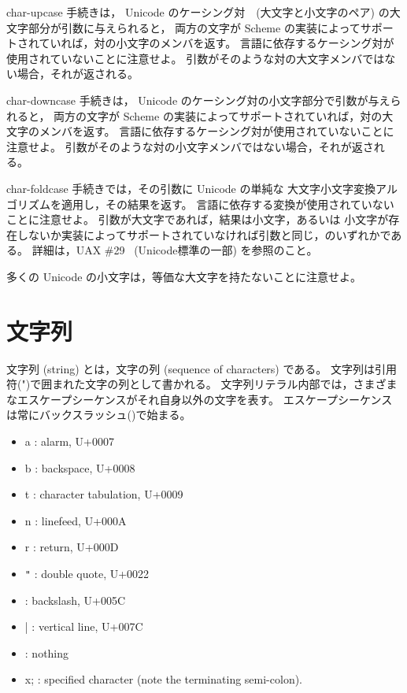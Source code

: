 \begin{entry}{%
}


{\cf char-upcase} 手続きは， Unicode のケーシング対　(大文字と小文字のペア) の大文字部分が引数に与えられると，
両方の文字が Scheme の実装によってサポートされていれば，対の小文字のメンバを返す。
言語に依存するケーシング対が使用されていないことに注意せよ。
引数がそのような対の大文字メンバではない場合，それが返される。

{\cf char-downcase} 手続きは， Unicode のケーシング対の小文字部分で引数が与えられると，
両方の文字が Scheme の実装によってサポートされていれば，対の大文字のメンバを返す。
言語に依存するケーシング対が使用されていないことに注意せよ。
引数がそのような対の小文字メンバではない場合，それが返される。

{\cf char-foldcase} 手続きでは，その引数に Unicode の単純な
大文字小文字変換アルゴリズムを適用し，その結果を返す。
言語に依存する変換が使用されていないことに注意せよ。
引数が大文字であれば，結果は小文字，あるいは
小文字が存在しないか実装によってサポートされていなければ引数と同じ，のいずれかである。
詳細は，UAX \#29~\cite{uax29} (Unicode標準の一部) を参照のこと。

多くの Unicode の小文字は，等価な大文字を持たないことに注意せよ。

\end{entry}


\section{文字列}
\label{stringsection}

文字列 (string) とは，文字の列 (sequence of characters) である。
\vest 文字列は引用符({\cf "})で囲まれた文字の列として書かれる。
文字列リテラル内部では，さまざまなエスケープシーケンスがそれ自身以外の文字を表す。
エスケープシーケンスは常にバックスラッシュ(\backwhack{})で始まる。

\begin{itemize}
\item{\cf\backwhack{}a} : alarm, U+0007
\item{\cf\backwhack{}b} : backspace, U+0008 
\item{\cf\backwhack{}t} : character tabulation, U+0009 
\item{\cf\backwhack{}n} : linefeed, U+000A 
\item{\cf\backwhack{}r} : return, U+000D 
\item{\cf\backwhack{}}\verb|"| : double quote, U+0022 
\item{\cf\backwhack{}\backwhack{}} : backslash, U+005C 
\item{\cf\backwhack{}|} : vertical line, U+007C
\item{\cf\backwhack{}
      } : nothing
\item{\cf\backwhack{}x;} : specified character (note the
  terminating semi-colon).
\end{itemize}

